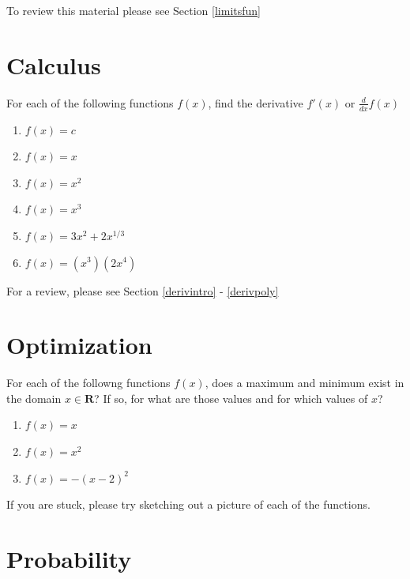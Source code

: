 \documentclass[
]{book}
\providecommand{\tightlist}{%
  \setlength{\itemsep}{0pt}\setlength{\parskip}{0pt}}
\theoremstyle{definition}
\theoremstyle{definition}
\theoremstyle{definition}
\theoremstyle{remark}
\begin{document}
To review this material please see Section \ref{limitsfun}

\hypertarget{calculus}{%
\section*{Calculus}\label{calculus}}

For each of the following functions \(f(x)\), find the derivative \(f'(x)\) or \(\frac{d}{dx}f(x)\)

\begin{enumerate}
\def\labelenumi{\arabic{enumi}.}
\tightlist
\item
  \(f(x)=c\)
\item
  \(f(x)=x\)
\item
  \(f(x)=x^2\)
\item
  \(f(x)=x^3\)
\item
  \(f(x)=3x^2+2x^{1/3}\)
\item
  \(f(x)=(x^3)(2x^4)\)
\end{enumerate}

For a review, please see Section \ref{derivintro} - \ref{derivpoly}

\hypertarget{optimization}{%
\section*{Optimization}\label{optimization}}

For each of the followng functions \(f(x)\), does a maximum and minimum exist in the domain \(x \in \mathbf{R}\)? If so, for what are those values and for which values of \(x\)?

\begin{enumerate}
\def\labelenumi{\arabic{enumi}.}
\tightlist
\item
  \(f(x) = x\)
\item
  \(f(x) = x^2\)
\item
  \(f(x) = -(x - 2)^2\)
\end{enumerate}

If you are stuck, please try sketching out a picture of each of the functions.

\hypertarget{probability}{%
\section*{Probability}\label{probability}}
\end{document}
